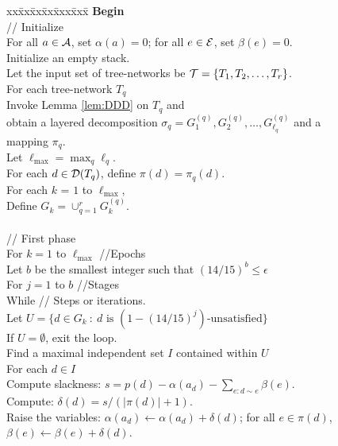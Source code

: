 \documentclass[11pt]{article}
\newcommand{\calA} {{\cal A}}
\newcommand{\calE} {{\cal E}}
\newcommand{\calT} {{\cal T}}
\newcommand{\calD} {{\cal D}}
\begin{document}
\begin{figure}[t!]
\begin{center}
\begin{boxedminipage}{\hsize}
\begin{tabbing}
xx\=xx\=xx\=xx\=xxx\=xxx\=\kill
\textbf{Begin}  \\
\> // Initialize \\
\> For all $a\in \calA$, set $\alpha(a)=0$; for all $e\in \calE$, set $\beta(e)=0$.\\
\> Initialize an empty stack.\\
\> Let the input set of tree-networks be $\calT= \{T_1, T_2, \ldots, T_r\}$.\\
\> For each tree-network $T_q$\\
\> \> Invoke Lemma \ref{lem:DDD} on $T_q$ and \\
\> \> \> obtain a layered decomposition $\sigma_q=G_1^{(q)}, G_2^{(q)}, \ldots, G_{\ell_q}^{(q)}$ and a mapping $\pi_q$.\\
\> \> Let $\ell_{\max} = \max_{q} \ell_q$. \\
\> \> For each $d\in \calD(T_q)$, define $\pi(d)=\pi_q(d)$.\\
\> For each $k$ = $1$ to $\ell_{\max}$, \\
\> \> Define $G_k = \cup_{q=1}^r G^{(q)}_k$.\\
\>\\
\> // First phase\\
\> For $k=1$ to $\ell_{\max}$ \quad\quad//Epochs\\
\> \> Let $b$ be the smallest integer such that $(14/15)^b\leq \epsilon$ \\
\> \> For $j=1$ to $b$ \quad \quad //Stages \\
\> \> \> While \quad \quad // Steps or iterations.\\
\> \> \> \> Let $U=\{d\in G_k~:~\mbox{$d$ is $(1-(14/15)^j)$-unsatisfied}\}$\\
\> \> \> \> If $U=\emptyset$, exit the loop.\\
\> \> \> \> Find a maximal independent set $I$ contained within $U$\\
\> \> \> \> For each $d\in I$\\
\> \> \> \> \> Compute slackness: $s=p(d) - \alpha(a_d) - \sum_{e:d\sim e} \beta(e)$.\\
\> \> \> \> \> Compute: $\delta(d) = s/(|\pi(d)|+1)$.\\
\> \> \> \> \> Raise the variables: $\alpha(a_d)\leftarrow \alpha(a_d)+\delta(d)$; 
		for all $e\in \pi(d)$, $\beta(e) \leftarrow \beta(e)+\delta(d)$.\\

\end{tabbing}
\end{boxedminipage}
\end{center}
\end{figure}
\end{document}
